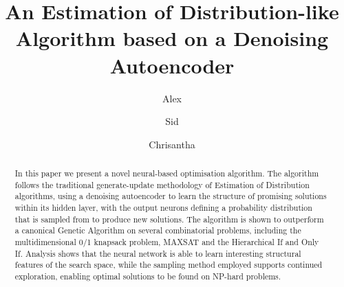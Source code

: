 \documentclass[runningheads,a4paper]{llncs}
\begin{document}
\mainmatter  %

\title{An Estimation of Distribution-like Algorithm based on a Denoising Autoencoder}


%
%
\author{Alex%
%
\and Sid\and Chrisantha}
%


%
%

\maketitle


\begin{abstract}
In this paper we present a novel neural-based optimisation algorithm. The algorithm follows the traditional generate-update methodology of Estimation of Distribution algorithms, using a denoising autoencoder to learn the structure of promising solutions within its hidden layer, with the output neurons defining a probability distribution that is sampled from to produce new solutions. The algorithm is shown to outperform a canonical Genetic Algorithm on several combinatorial problems, including the multidimensional 0/1 knapsack problem, MAXSAT and the Hierarchical If and Only If. Analysis shows that the neural network is able to learn interesting structural features of the search space, while the sampling method employed supports continued exploration, enabling optimal solutions to be found on NP-hard problems.
\end{abstract}
\end{document}
